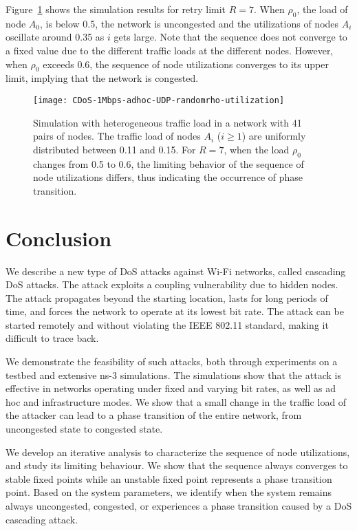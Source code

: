 \documentclass{IEEEtran}
\begin{document}
Figure~\ref{CDoS-1Mbps-adhoc-UDP-randomrho-utilization} shows the simulation results for retry limit $R=7$. 
When $\rho_0$, the load of node $A_0$,   is below 0.5, the network is uncongested and the utilizations of nodes $A_i$ oscillate around 0.35 as $i$ gets large. Note that the sequence does not converge to a fixed value due to the different traffic loads at the different nodes.
However, when $\rho_0$ exceeds 0.6, the sequence of node utilizations converges to its upper limit, implying that the network is congested. 


\begin{figure}[!t]
\centering
\texttt{[image: CDoS-1Mbps-adhoc-UDP-randomrho-utilization]}
\caption{Simulation with heterogeneous traffic load in a network with 41 pairs of nodes. The traffic load of nodes $A_i$ ($i \geq 1$) are uniformly
distributed between 0.11 and 0.15. For $R=7$, when the load $\rho_0$ changes from 0.5 to 0.6, the limiting behavior of the sequence of node utilizations differs, thus indicating the occurrence of phase transition.}
\label{CDoS-1Mbps-adhoc-UDP-randomrho-utilization}
\end{figure}



\section{Conclusion}
\label{Conclusion}
We describe a new type of DoS attacks against Wi-Fi networks, called cascading DoS attacks.
The attack exploits a coupling vulnerability due to hidden nodes.
The attack propagates beyond the starting location, lasts for long periods of
time, and forces the network to operate at its lowest bit rate. The attack can be started
remotely and without violating the IEEE 802.11 standard, making it
difficult to trace back.

We demonstrate the feasibility of such attacks, both through experiments on a testbed and extensive ns-3 simulations.
The simulations show that the attack is effective in networks operating under fixed and varying bit rates, as well
as ad hoc and infrastructure modes. We show that a small change
in the traffic load of the attacker can lead to a phase transition of the entire network, from uncongested state to congested state.

We develop an iterative analysis to characterize the sequence of node utilizations, and study its limiting behaviour. We show that the sequence
always converges to stable fixed points while an unstable fixed point represents a phase transition point. Based on the system parameters, we
identify when the system remains always uncongested, congested, or experiences a phase transition caused by a DoS cascading attack.
\end{document}
